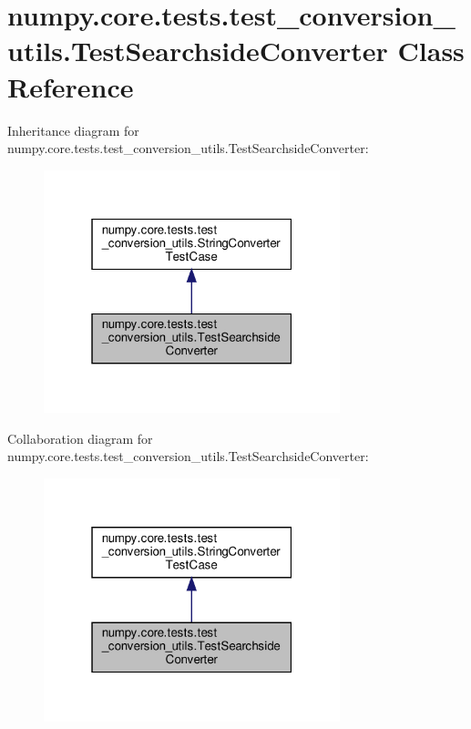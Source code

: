 \hypertarget{classnumpy_1_1core_1_1tests_1_1test__conversion__utils_1_1TestSearchsideConverter}{}\section{numpy.\+core.\+tests.\+test\+\_\+conversion\+\_\+utils.\+Test\+Searchside\+Converter Class Reference}
\label{classnumpy_1_1core_1_1tests_1_1test__conversion__utils_1_1TestSearchsideConverter}


Inheritance diagram for numpy.\+core.\+tests.\+test\+\_\+conversion\+\_\+utils.\+Test\+Searchside\+Converter\+:
\nopagebreak
\begin{figure}[H]
\begin{center}
\leavevmode
\includegraphics[width=244pt]{classnumpy_1_1core_1_1tests_1_1test__conversion__utils_1_1TestSearchsideConverter__inherit__graph}
\end{center}
\end{figure}


Collaboration diagram for numpy.\+core.\+tests.\+test\+\_\+conversion\+\_\+utils.\+Test\+Searchside\+Converter\+:
\nopagebreak
\begin{figure}[H]
\begin{center}
\leavevmode
\includegraphics[width=244pt]{classnumpy_1_1core_1_1tests_1_1test__conversion__utils_1_1TestSearchsideConverter__coll__graph}
\end{center}
\end{figure}
